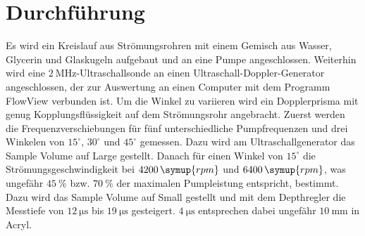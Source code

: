 \section{Durchführung}
\label{sec:Durchführung}

Es wird ein Kreislauf aus Strömungsrohren mit einem Gemisch aus Wasser, Glycerin und Glaskugeln aufgebaut
und an eine Pumpe angeschlossen. Weiterhin wird eine $\SI{2}{\mega\hertz}$-Ultraschallsonde an einen
Ultraschall-Doppler-Generator angeschlossen, der zur Auswertung an einen Computer mit dem Programm
FlowView verbunden ist. Um die Winkel zu variieren wird ein Dopplerprisma mit genug Kopplungsflüssigkeit auf dem
Strömungsrohr angebracht. Zuerst werden die Frequenzverschiebungen für fünf unterschiedliche Pumpfrequenzen und
drei Winkelen von $15^{\circ}$, $30^{\circ}$ und $45^{\circ}$ gemessen. Dazu wird am Ultraschallgenerator das
Sample Volume auf Large gestellt. Danach für einen Winkel von $15^{\circ}$ die Strömungsgeschwindigkeit bei
$4200\,\symup{rpm}$ und $6400\,\symup{rpm}$, was ungefähr $\SI{45}{\%}$ bzw. $\SI{70}{\%}$ der maximalen
Pumpleistung entspricht, bestimmt. Dazu wird das Sample Volume auf Small gestellt und mit dem Depthregler
die Messtiefe von $\SI{12}{\micro\second}$ bis $\SI{19}{\micro\second}$ gesteigert. $\SI{4}{\micro\second}$
entsprechen dabei ungefähr $\SI{10}{\milli\meter}$ in Acryl.